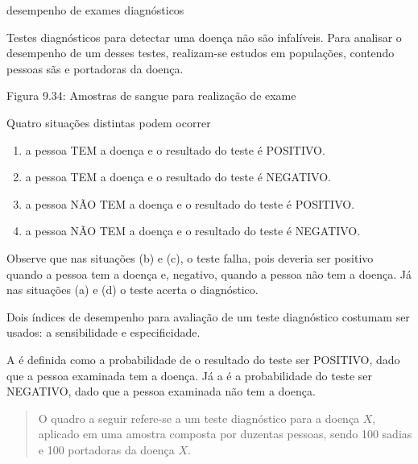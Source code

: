 \label{\detokenize{PE511-8:praticando-probabilidade-condicional}}\label{\detokenize{PE511-8::doc}}\begin{task}{desempenho de exames diagnósticos}
\label{ativ-especificidade-sensibilidade}

Testes diagnósticos para detectar uma doença não são infalíveis. Para analisar o desempenho de um desses testes, realizam-se estudos em populações, contendo pessoas sãs e portadoras da doença.
\label{\detokenize{PE511-8:fig-coloque-aqui-o-nome}}
\begin{figure}[H]
\centering

\noindent{}
\label{\detokenize{PE511-8:fig-coloque-aqui-o-nome}}\end{figure}

Figura 9.34: Amostras de sangue para realização de exame

Quatro situações distintas podem ocorrer
\begin{enumerate}
\item {} 
a pessoa TEM a doença e o resultado do teste é POSITIVO.

\item {} 
a pessoa TEM a doença e o resultado do teste é NEGATIVO.

\item {} 
a pessoa NÃO TEM a doença e o resultado do teste é POSITIVO.

\item {} 
a pessoa NÃO TEM a doença e o resultado do teste é NEGATIVO.

\end{enumerate}

Observe que nas situações (b) e (c), o teste falha, pois deveria ser positivo quando a pessoa tem a doença e, negativo, quando a pessoa não tem a doença. Já nas situações (a) e (d) o teste acerta o diagnóstico.

Dois índices de desempenho para avaliação de um teste diagnóstico costumam ser usados: a sensibilidade e especificidade.

A  é definida como a probabilidade de o resultado do teste ser POSITIVO, dado que a pessoa examinada tem a doença. Já a  é a probabilidade do teste ser NEGATIVO, dado que a pessoa examinada não tem a doença.
\begin{quote}

O quadro a seguir refere-se a um teste diagnóstico para a doença \(X\), aplicado em uma amostra composta por duzentas pessoas, sendo 100 sadias e 100 portadoras da doença \(X\).



\end{quote}
\end{task}
